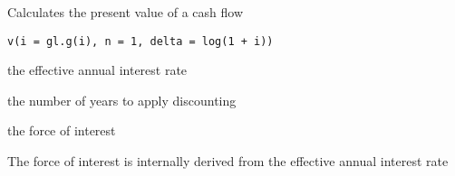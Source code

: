 \documentclass[a4paper]{book}
\begin{document}
%
\begin{Description}\relax
Calculates the present value of a cash flow
\end{Description}
%
\begin{Usage}
\begin{verbatim}
v(i = gl.g(i), n = 1, delta = log(1 + i))
\end{verbatim}
\end{Usage}
%
\begin{Arguments}
\begin{ldescription}
\item[\code{i}] the effective annual interest rate

\item[\code{n}] the number of years to apply discounting

\item[\code{delta}] the force of interest
\end{ldescription}
\end{Arguments}
%
\begin{Details}\relax
The force of interest is internally derived from the effective annual interest rate
\end{Details}
\printindex{}
\end{document}
